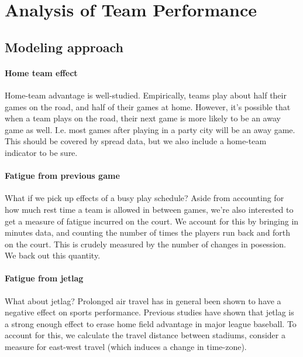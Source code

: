 \documentclass[letterpaper,12pt]{article}
\begin{document}
\section{Analysis of Team Performance}

\subsection{Modeling approach}

\paragraph{Home team effect}
Home-team advantage is well-studied.\citep{jones07, jones08}  
Empirically, teams play about half their games on the road, and half of their games at home. However,
it's possible that when a team plays on the road, their next game is more likely to be
an away game as well. I.e. most games after playing in a party city will be an away game.
This should be covered by spread data, but we also include
a home-team indicator to be sure.

\paragraph{Fatigue from previous game}
What if we pick up effects of a busy play schedule?
Aside from accounting for how much rest time a team is allowed in between games,
we're also interested to get a measure of
fatigue incurred on the court.
We account for this by bringing in minutes data, and counting the number of 
times the players run back and forth on the court. This is crudely measured
by the number of changes in posession. We back out this quantity.

\paragraph{Fatigue from jetlag}
What about jetlag? Prolonged air travel has in general been shown
to have a negative effect on sports performance.\citep{leeandgalvez}
Previous studies have shown that jetlag is a strong enough effect
to erase home field advantage in major league baseball.\citep{songetal}
To account for this, we calculate the travel distance between stadiums,
consider a measure for east-west travel (which induces a change in time-zone).
\end{document}
